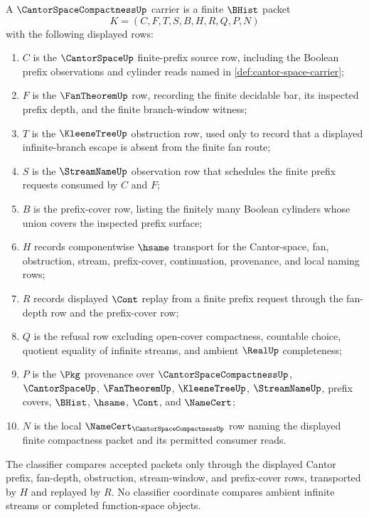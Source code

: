 \begin{definition}
\label{def:cantor-space-compactness-carrier}
A $\CantorSpaceCompactnessUp$ carrier is a finite $\BHist$ packet
$$
K=(C,F,T,S,B,H,R,Q,P,N)
$$
with the following displayed rows:
\begin{enumerate}
\item $C$ is the $\CantorSpaceUp$ finite-prefix source row, including the Boolean prefix observations and cylinder reads named in \autoref{def:cantor-space-carrier};
\item $F$ is the $\FanTheoremUp$ row, recording the finite decidable bar, its inspected prefix depth, and the finite branch-window witness;
\item $T$ is the $\KleeneTreeUp$ obstruction row, used only to record that a displayed infinite-branch escape is absent from the finite fan route;
\item $S$ is the $\StreamNameUp$ observation row that schedules the finite prefix requests consumed by $C$ and $F$;
\item $B$ is the prefix-cover row, listing the finitely many Boolean cylinders whose union covers the inspected prefix surface;
\item $H$ records componentwise $\hsame$ transport for the Cantor-space, fan, obstruction, stream, prefix-cover, continuation, provenance, and local naming rows;
\item $R$ records displayed $\Cont$ replay from a finite prefix request through the fan-depth row and the prefix-cover row;
\item $Q$ is the refusal row excluding open-cover compactness, countable choice, quotient equality of infinite streams, and ambient $\RealUp$ completeness;
\item $P$ is the $\Pkg$ provenance over $\CantorSpaceCompactnessUp$, $\CantorSpaceUp$, $\FanTheoremUp$, $\KleeneTreeUp$, $\StreamNameUp$, prefix covers, $\BHist$, $\hsame$, $\Cont$, and $\NameCert$;
\item $N$ is the local $\NameCert_{\CantorSpaceCompactnessUp}$ row naming the displayed finite compactness packet and its permitted consumer reads.
\end{enumerate}
The classifier compares accepted packets only through the displayed Cantor prefix, fan-depth, obstruction, stream-window, and prefix-cover rows, transported by $H$ and replayed by $R$. No classifier coordinate compares ambient infinite streams or completed function-space objects.
\end{definition}

